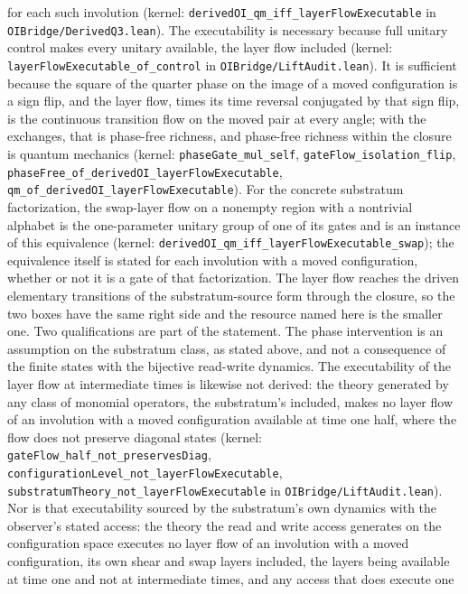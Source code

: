 \documentclass[
]{article}
\begin{document}
for each such involution (kernel:
\texttt{derivedOI\_qm\_iff\_layerFlowExecutable\textquotesingle{}} in
\texttt{OIBridge/DerivedQ3.lean}). The executability is necessary
because full unitary control makes every unitary available, the layer
flow included (kernel: \texttt{layerFlowExecutable\_of\_control} in
\texttt{OIBridge/LiftAudit.lean}). It is sufficient because the square
of the quarter phase on the image of a moved configuration is a sign
flip, and the layer flow, times its time reversal conjugated by that
sign flip, is the continuous transition flow on the moved pair at every
angle; with the exchanges, that is phase-free richness, and phase-free
richness within the closure is quantum mechanics (kernel:
\texttt{phaseGate\_mul\_self}, \texttt{gateFlow\_isolation\_flip},
\texttt{phaseFree\_of\_derivedOI\_layerFlowExecutable},
\texttt{qm\_of\_derivedOI\_layerFlowExecutable}). For the concrete
substratum factorization, the swap-layer flow on a nonempty region with
a nontrivial alphabet is the one-parameter unitary group of one of its
gates and is an instance of this equivalence (kernel:
\texttt{derivedOI\_qm\_iff\_layerFlowExecutable\_swap\textquotesingle{}});
the equivalence itself is stated for each involution with a moved
configuration, whether or not it is a gate of that factorization. The
layer flow reaches the driven elementary transitions of the
substratum-source form through the closure, so the two boxes have the
same right side and the resource named here is the smaller one. Two
qualifications are part of the statement. The phase intervention is an
assumption on the substratum class, as stated above, and not a
consequence of the finite states with the bijective read-write dynamics.
The executability of the layer flow at intermediate times is likewise
not derived: the theory generated by any class of monomial operators,
the substratum's included, makes no layer flow of an involution with a
moved configuration available at time one half, where the flow does not
preserve diagonal states (kernel:
\texttt{gateFlow\_half\_not\_preservesDiag},
\texttt{configurationLevel\_not\_layerFlowExecutable},
\texttt{substratumTheory\_not\_layerFlowExecutable} in
\texttt{OIBridge/LiftAudit.lean}). Nor is that executability sourced by
the substratum's own dynamics with the observer's stated access: the
theory the read and write access generates on the configuration space
executes no layer flow of an involution with a moved configuration, its
own shear and swap layers included, the layers being available at time
one and not at intermediate times, and any access that does execute one
\end{document}
